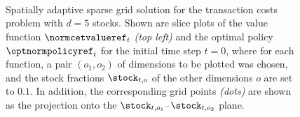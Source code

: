 \begin{figure}
  \hfill%
  \hfill%
  \hfill%
  \\[1mm]%
  \hfill%
  \hfill%
  \hfill%
  \\[1mm]%
  \hfill%
  \hfill%
  \hfill%
  \\[1mm]%
  \hfill%
  \hfill%
  \hfill%
  \caption[Sparse grid solution for the five-dimensional TCP]{%
    Spatially adaptive sparse grid solution for the transaction costs problem
    with $d = 5$ stocks.
    \vspace{-0.15em}%
    Shown are slice plots of
    the value function $\normcetvalueref_t$ \emph{(top left)} and
    the optimal policy $\optnormpolicyref_t$ for the initial time step $t = 0$,
    where for each function, a pair $(o_1, o_2)$
    of dimensions to be plotted was chosen,
    and the stock fractions $\stock_{t,o}$ of the other dimensions $o$
    are set to $0.1$.
    In addition, the corresponding grid points \emph{(dots)}
    are shown as the projection onto the
    $\stock_{t,o_1}$--$\stock_{t,o_2}$ plane.%
  }%
  \label{fig:financeSolution5DSparseGrid}%
\end{figure}%
